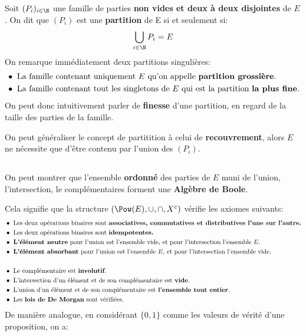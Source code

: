 \subsection*{}

Soit \((P_i)_{i \in \N}\) une famille de parties \textbf{non vides et deux à deux disjointes} de \(E\).\+
On dit que \((P_i)\) est une \textbf{partition} de E si et seulement si:
\[
    \bigcup_{i \in \N} P_i = E
\]
On remarque immédiatement deux partitions singulières:
\begin{align*}
    &\bullet \text{ La famille contenant uniquement } E \text{ qu'on appelle \textbf{partition grossière}.} \\
    &\bullet \text{ La famille contenant tout les singletons de } E \text{ qui est la partition \textbf{la plus fine}.}
\end{align*}
On peut donc intuitivement parler de \textbf{finesse} d'une partition, en regard de la taille des parties de la famille.\<

On peut généraliser le concept de partitition à celui de \textbf{recouvrement}, alors \(E\) ne nécessite que d'être contenu par l'union des \((P_i)\).
\subsection*{}

On peut montrer que l'ensemble \textbf{ordonné} des parties de \(E\) muni de l'union, l'intersection, le complémentaires forment une \textbf{Algèbre de Boole}.\<

Cela signifie que la structure \((\Pow(E), \cup, \cap, X^c)\) vérifie les axiomes suivants:
\begin{align*}
    &\bullet \text{ Les deux opérations binaires sont \textbf{associatives, commutatives et distributives l'une sur l'autre.}}\\
    &\bullet \text{ Les deux opérations binaires sont \textbf{idempotentes.}}\\
    &\bullet \text{ \textbf{L'élément neutre} pour l'union est l'ensemble vide, et pour l'intersection l'ensemble \(E\).}\\
    &\bullet \text{ \textbf{L'élément absorbant} pour l'union est l'ensemble \(E\), et pour l'intersection l'ensemble vide.}\\
    &\\
    &\bullet \text{ Le complémentaire est \textbf{involutif}.}\\
    &\bullet \text{ L'intersection d'un élément et de son complémentaire est \textbf{vide}.}\\
    &\bullet \text{ L'union d'un élément et de son complémentaire est \textbf{l'ensemble tout entier}.}\\
    &\bullet \text{ Les \textbf{lois de De Morgan} sont vérifiées.}\\
\end{align*}
De manière analogue, en considérant \(\{0, 1\}\) comme les valeurs de vérité d'une proposition, on a:

